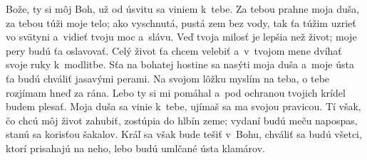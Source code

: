 Bože, ty si môj Boh, už od úsvitu sa viniem k~tebe.
\versseparator
Za tebou prahne moja duša,
za tebou túži moje telo;
\versseparator
ako vyschnutá, pustá zem bez vody,
tak ťa túžim uzrieť vo svätyni
a~vidieť tvoju moc a~slávu.
\versseparator
Veď tvoja milosť je lepšia než život;
moje pery budú ťa oslavovať.
\versseparator
Celý život ťa chcem velebiť
a~v~tvojom mene dvíhať svoje ruky k~modlitbe.
\versseparator
Sťa na bohatej hostine sa nasýti moja duša
a~moje ústa ťa budú chváliť jasavými perami.
\versseparator
Na svojom lôžku myslím na teba,
o tebe rozjímam hneď za rána.
Lebo ty si mi pomáhal
\versseparator
a~pod ochranou tvojich krídel budem plesať.
Moja duša sa vinie k~tebe,
ujímaš sa ma svojou pravicou.
\versseparator
Tí však, čo chcú môj život zahubiť,
zostúpia do hlbín zeme;
vydaní budú meču napospas,
stanú sa korisťou šakalov.
\versseparator
Kráľ sa však bude tešiť v~Bohu,
chváliť sa budú všetci, ktorí prisahajú na neho,
lebo budú umlčané ústa klamárov. 